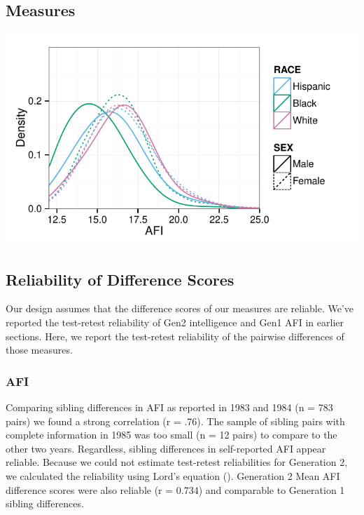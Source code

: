 \documentclass[a4paper,man,apacite,natbib,12pt,longtable]{apa6}\usepackage[]{graphicx}\usepackage[]{color}
\newenvironment{knitrout}{}{} %
\begin{document}
\subsection{Measures}

\noindent\begin{minipage}{\linewidth}
\label{plot_afi_by_race_sex}
\begin{center}
\begin{knitrout}
\color{fgcolor}
\includegraphics[width=.8\paperwidth]{figure/plot_afi_by_race_sex-1} 

\end{knitrout}
\end{center}
\end{minipage}
%

%
\subsection{Reliability of Difference Scores}

Our design assumes that the difference scores of our measures are reliable. We've reported the test-retest reliability of Gen2 intelligence and Gen1 AFI in earlier sections. Here, we report the test-retest reliability of the pairwise differences of those measures. 
\subsubsection{AFI} Comparing sibling differences in AFI as reported in 1983 and 1984 (n = 783 pairs) we found a strong correlation (r = .76). The sample of sibling pairs with complete information in 1985 was too small (n = 12 pairs) to compare to the other two years. Regardless, sibling differences in self-reported AFI appear reliable. Because we could not estimate test-retest reliabilities for Generation 2, we calculated the reliability using Lord's equation (\citeyear{Lord1963}). Generation 2 Mean AFI difference scores were also reliable (r = 0.734) and comparable to Generation 1 sibling differences.
\end{document}
